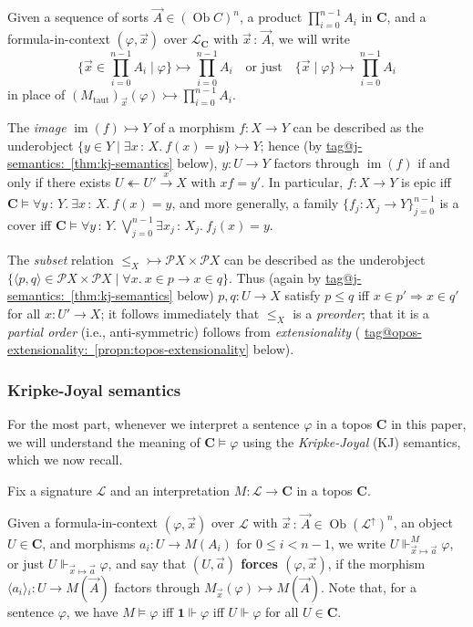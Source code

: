 \documentclass{amsart}
\makeatletter
\newcommand\bC{\mathbf{C}}
\newcommand\br[1]{\langle{}#1\rangle{}}
\newcommand\cL{\mathcal{L}}
\newcommand\defword[1]{{\boldmath \textbf{#1}}}
\newcommand\im{\operatorname{im}}
\newcommand\Ob{\operatorname{Ob}}
\newcommand\oot{\twoheadleftarrow}
\renewcommand\phi{\varphi}
\newcommand\pow{\mathcal{P}}
\newcommand\set[2][]{#1\{ #2 #1\}}
\newcommand\tm{\mathbf{1}}
\newcommand\tolon{{\,:\,}}
\newcommand\tox[2][]{\xrightarrow[#1]{#2}}
\newcommand\To{\Rightarrow}
\newcommand\tprod{{\textstyle \prod}}
\newcommand\tto{\rightarrowtail}
\newcommand\up{\uparrow}
\newcommand\vA{\vek{A}}
\newcommand\va{\vek{a}}
\newcommand\vek[1]{{\vec{#1}}}
\newcommand\vx{\vek{x}}
\newcommand\tagword[1]{\csname tag@#1\endcsname}
\def\label@tag#1:#2\@nil{#1}
\newcommand\labeltag[1]{\label@tag#1:\@nil}
\newcommand\jref[1]{%
  \texorpdfstring%
    {\hyperref[#1]{\tagword{\labeltag{#1}}~\ref*{#1}}}%
    {\tagword{\labeltag{#1}}~\ref*{#1}}%
}
\theoremstyle{definition}
\theoremstyle{remark}
\theoremstyle{plainwithref}
\makeatother
\begin{document}
Given a sequence of sorts \( \vA \in (\Ob C)^n \), a product \( \prod_{i=0}^{n-1} A_i \) in \( \bC \), and a formula-in-context \( (\phi, \vx) \) over \( \cL_{\bC} \) with \( \vx \tolon \vA \), we will write
\[
  \set{\vx \in \tprod_{i=0}^{n-1} A_i \mid \phi} \tto \prod_{i=0}^{n-1} A_i
  \quad
  \text{or just}
  \quad
  \set{\vx \mid \phi} \tto \prod_{i=0}^{n-1} A_i
\]
in place of \( (M_{\mathrm{taut}})_{\vx}(\phi) \tto \prod_{i=0}^{n-1} A_i \).

\begin{exm} \label{exm:im-as-setbuilder}
  The \emph{image} \( \im(f) \tto Y \) of a morphism \( f \colon X \to Y \) can be described as the underobject \( \set{ y \in Y \mid \exists x \tolon X.\ f(x) = y } \tto Y \); hence (by \jref{thm:kj-semantics} below), \( y \colon U \to Y \) factors through \( \im(f) \) if and only if there exists \( U \oot U' \tox{x} X \) with \( x f = y' \).
  In particular, \( f \colon X \to Y \) is epic iff \( \bC \vDash \forall y \tolon Y.\ \exists x \tolon X.\ f(x) = y \), and more generally, a family \( \set{f_j \colon X_j \to Y}_{j=0}^{n-1} \) is a cover iff \( \bC \vDash \forall y \tolon Y.\ \bigvee_{j=0}^{n-1} \exists x_j \tolon X_j.\ f_j(x) = y \).

  The \emph{subset} relation \( {\le_X} \tto \pow X \times \pow X \) can be described as the underobject \( \set{ \br{p, q} \in \pow X \times \pow X \mid \forall x.\ x \in p \to x \in q } \).
  Thus (again by \jref{thm:kj-semantics} below) \( p,q \colon U \to X \) satisfy \( p \le q \) iff \( x \in p' \To x \in q' \) for all \( x \colon U' \to X \); it follows immediately that \( {\le_X} \) is a \emph{preorder}; that it is a \emph{partial order} (i.e., anti-symmetric) follows from \emph{extensionality} (\jref{propn:topos-extensionality} below).
\end{exm}

\subsubsection{Kripke-Joyal semantics} \label{subsubsec:kj-semantics}
For the most part, whenever we interpret a sentence \( \phi \) in a topos \( \bC \) in this paper, we will understand the meaning of \( \bC \vDash \phi \) using the \emph{Kripke-Joyal} (KJ) semantics, which we now recall.

Fix a signature \( \cL \) and an interpretation \( M \colon \cL \to \bC \) in a topos \( \bC \).

Given a formula-in-context \( (\phi,\vx) \) over \( \cL \) with \( \vx \tolon \vA \in \Ob (\cL^\up)^n \), an object \( U \in \bC \), and morphisms \( a_i \colon U \to M(A_i) \) for \( 0 \le i < n - 1 \), we write \( U \Vdash^M_{\vx \mapsto \va} \phi \), or just \( U \Vdash_{\vx \mapsto \va} \phi \), and say that \defword{\( (U,\va) \) forces \( (\phi,\vx) \)}, if the morphism \( \br{a_i}_i \colon U \to M(\vA) \) factors through \( M_{\vx}(\phi) \tto M(\vA) \).
Note that, for a sentence \( \phi \), we have \( M \vDash \phi \) iff \( \tm \Vdash \phi \) iff \( U \Vdash \phi \) for all \( U \in \bC \).
\end{document}
